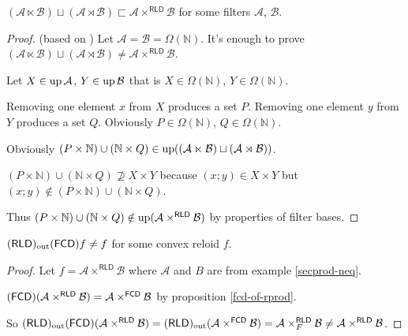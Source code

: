 \begin{example}
$(\mathcal{A}\ltimes\mathcal{B})\sqcup(\mathcal{A}\rtimes\mathcal{B})\sqsubset\mathcal{A}\times^{\mathsf{RLD}}\mathcal{B}$
for some filters $\mathcal{A}$, $\mathcal{B}$.\end{example}
\begin{proof}
(based on \cite{MO72638}) Let $\mathcal{A}=\mathcal{B}=\Omega(\mathbb{N})$.
It's enough to prove $(\mathcal{A}\ltimes\mathcal{B})\sqcup(\mathcal{A}\rtimes\mathcal{B})\neq\mathcal{A}\times^{\mathsf{RLD}}\mathcal{B}$.

Let $X\in\operatorname{up}\mathcal{A}$, $Y\in\operatorname{up}\mathcal{B}$ that is $X\in\Omega(\mathbb{N})$,
$Y\in\Omega(\mathbb{N})$.

Removing one element $x$ from $X$ produces a set $P$. Removing
one element $y$ from $Y$ produces a set $Q$. Obviously $P\in\Omega(\mathbb{N})$,
$Q\in\Omega(\mathbb{N})$.

Obviously $(P\times\mathbb{N})\cup(\mathbb{N}\times Q)\in\operatorname{up}((\mathcal{A}\ltimes\mathcal{B})\sqcup(\mathcal{A}\rtimes\mathcal{B}))$.

$(P\times\mathbb{N})\cup(\mathbb{N}\times Q)\nsupseteq X\times Y$
because $(x;y)\in X\times Y$ but $(x;y)\notin(P\times\mathbb{N})\cup(\mathbb{N}\times Q)$.

Thus $(P\times\mathbb{N})\cup(\mathbb{N}\times Q)\notin\operatorname{up}(\mathcal{A}\times^{\mathsf{RLD}}\mathcal{B})$
by properties of filter bases.\end{proof}
\begin{example}
$(\mathsf{RLD})_{\mathrm{out}}(\mathsf{FCD}) f\ne f$ for some convex reloid $f$.\end{example}
\begin{proof}
Let $f=\mathcal{A}\times^{\mathsf{RLD}}\mathcal{B}$ where $\mathcal{A}$
and $B$ are from example \ref{secprod-neq}.

$(\mathsf{FCD})(\mathcal{A}\times^{\mathsf{RLD}}\mathcal{B})=\mathcal{A}\times^{\mathsf{FCD}}\mathcal{B}$
by proposition \ref{fcd-of-rprod}.

So $(\mathsf{RLD})_{\mathrm{out}}(\mathsf{FCD})(\mathcal{A}\times^{\mathsf{RLD}}\mathcal{B})=(\mathsf{RLD})_{\mathrm{out}}(\mathcal{A}\times^{\mathsf{FCD}}\mathcal{B})=\mathcal{A}\times_{F}^{\mathsf{RLD}}\mathcal{B}\ne\mathcal{A}\times^{\mathsf{RLD}}\mathcal{B}$.\end{proof}

